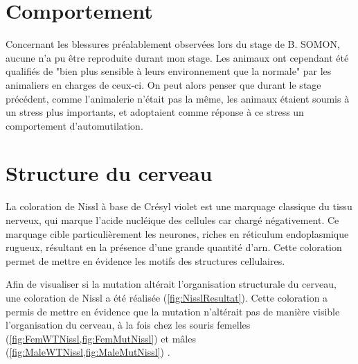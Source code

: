 \section{Comportement}
\label{sec:Comportement}
Concernant les blessures préalablement observées lors du stage de B. SOMON, aucune n'a pu être reproduite durant mon stage. Les animaux ont cependant été qualifiés de "bien plus sensible à leurs environnement que la normale" par les animaliers en charges de ceux-ci. On peut alors penser que durant le stage précédent, comme l'animalerie n'était pas la même, les animaux étaient soumis à un stress plus importants, et adoptaient comme réponse à ce stress un comportement d'automutilation. 

\section{Structure du cerveau}
\label{sec:NisslResultat}
La coloration de Nissl à base de Crésyl violet est une marquage classique du tissu nerveux, qui marque l'acide nucléique des cellules car chargé négativement. Ce marquage cible particulièrement les neurones, riches en réticulum endoplasmique rugueux, résultant en la présence d'une grande quantité d'\acrshort{arn}. Cette coloration permet de mettre en évidence les motifs des structures cellulaires.

Afin de visualiser si la mutation \mcrd altérait l'organisation structurale du cerveau, une coloration de Nissl a été réalisée (\cref{fig:NisslResultat}). Cette coloration a permis de mettre en évidence que la mutation n'altérait pas de manière visible l'organisation du cerveau, à la fois chez les souris femelles (\cref{fig:FemWTNissl,fig:FemMutNissl}) et mâles (\cref{fig:MaleWTNissl,fig:MaleMutNissl}) .

